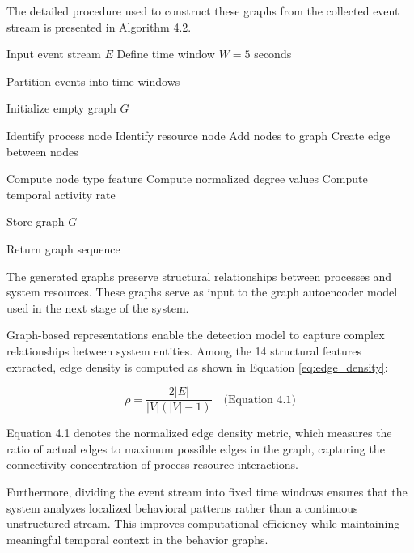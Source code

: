 The detailed procedure used to construct these graphs from the collected event stream is presented in Algorithm 4.2.

\begin{algorithm}
\caption{Behavior Graph Construction}
\begin{algorithmic}[1]

\State Input event stream $E$
\State Define time window $W = 5$ seconds

\State Partition events into time windows


\State Initialize empty graph $G$


\State Identify process node
\State Identify resource node
\State Add nodes to graph
\State Create edge between nodes

\EndFor


\State Compute node type feature
\State Compute normalized degree values
\State Compute temporal activity rate

\EndFor

\State Store graph $G$

\EndFor

\State Return graph sequence

\end{algorithmic}
\end{algorithm}

The generated graphs preserve structural relationships between processes and system resources. These graphs serve as input to the graph autoencoder model used in the next stage of the system.

Graph-based representations enable the detection model to capture complex relationships between system entities. Among the 14 structural features extracted, edge density is computed as shown in Equation \ref{eq:edge_density}:

\begin{equation}
\rho = \frac{2|E|}{|V|(|V|-1)} \quad \text{(Equation 4.1)}
\label{eq:edge_density}
\end{equation}

Equation 4.1 denotes the normalized edge density metric, which measures the ratio of actual edges to maximum possible edges in the graph, capturing the connectivity concentration of process-resource interactions.

Furthermore, dividing the event stream into fixed time windows ensures that the system analyzes localized behavioral patterns rather than a continuous unstructured stream. This improves computational efficiency while maintaining meaningful temporal context in the behavior graphs.



